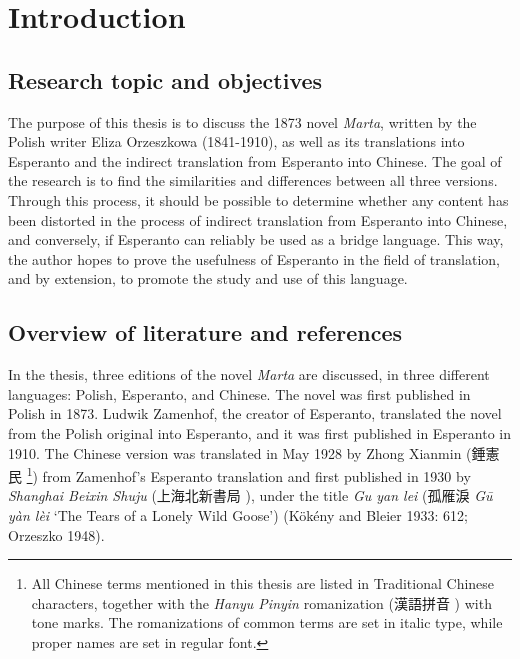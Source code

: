 \chapter{Introduction}

\section{Research topic and objectives}
The purpose of this thesis is to discuss the 1873 novel \textit{Marta}, written by the Polish writer Eliza Orzeszkowa (1841-1910), as well as its translations into Esperanto and the indirect translation from Esperanto into Chinese.
The goal of the research is to find the similarities and differences between all three versions. %
Through this process, it should be possible to determine whether any content has been distorted in the process of indirect translation from Esperanto into Chinese, and conversely, if Esperanto can reliably be used as a bridge language.
This way, the author hopes to prove the usefulness of Esperanto in the field of translation, and by extension, to promote the study and use of this language.

\section{Overview of literature and references}
In the thesis, three editions of the novel \textit{Marta} are discussed, in three different languages: Polish, Esperanto, and Chinese.
The novel was first published in Polish in 1873.
Ludwik Zamenhof, the creator of Esperanto, translated the novel from the Polish original into Esperanto, and it was first published in Esperanto in 1910.
The Chinese version was translated in May 1928 by Zhong Xianmin (錘憲民 %
\footnote{All Chinese terms mentioned in this thesis are listed in Traditional Chinese characters, together with the \textit{Hanyu Pinyin} romanization (漢語拼音 ) with tone marks. The romanizations of common terms are set in italic type, while proper names are set in regular font.}) %
from Zamenhof's Esperanto translation and first published in 1930 by \textit{Shanghai Beixin Shuju} (上海北新書局 ), under the title \textit{Gu yan lei} (孤雁淚 \textit{Gū yàn lèi} `The Tears of a Lonely Wild Goose')
(Kökény and Bleier 1933: 612; Orzeszko 1948).

